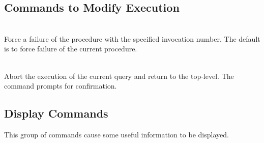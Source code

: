 \subsection{Commands to Modify Execution}
\begin{descr}{1cm}

\\
Force a failure of the procedure with the specified invocation number.
The default is to force failure of the current procedure.

\\
Abort the execution of the current query and return to the top-level.
The command prompts for confirmation.
\end{descr}


\subsection{Display Commands}
This group of commands cause some useful information to be displayed.

